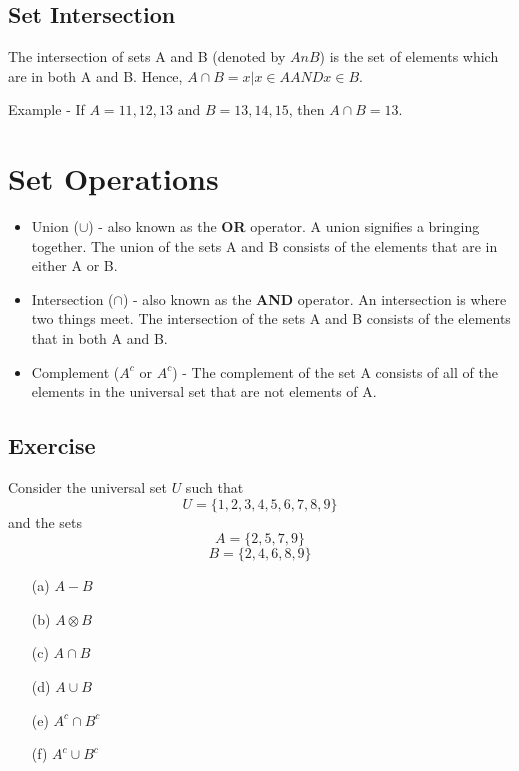 \documentclass[12pt]{article}
\begin{document}
\subsection{Set Intersection}
The intersection of sets A and B (denoted by $AnB$) is the set of elements which are in both A and B. Hence, $A \cap B={x|x \in A AND x \in B}$.

Example - If $A={11,12,13}$ and $B={13,14,15}$, then $A \cap B={13}$.


\newpage
\section*{Set Operations}
\begin{itemize}
	\item Union ($\cup$) - also known as the \textbf{OR} operator. A union signifies a bringing together. The union of the sets A and B consists of the elements that are in either A or B.
	\item Intersection ($\cap$) - also known as the \textbf{AND} operator. An intersection is where two things meet. The intersection of the sets A and B consists of the elements that in both A and B.
	\item Complement ($A^{c}$ or $A^{c}$) - The complement of the set A consists of all of the elements in the universal set that are not elements of A.
\end{itemize}
\subsection*{Exercise}
Consider the universal set $U$ such that
\[U=\{1,2,3,4,5,6,7,8,9\} \]
and the sets
\[A=\{2,5,7,9\} \]
\[B=\{2,4,6,8,9\} \]
\begin{multicols}{2}
\begin{itemize}
	\item[(a)] $A-B$
	\item[(b)] $A \otimes B$
	\item[(c)] $A \cap B$
	\item[(d)] $A \cup B$
	\item[(e)] $A^{c} \cap B^{c}$
	\item[(f)] $A^{c} \cup B^{c}$
\end{itemize}
\end{multicols}
\newpage
\end{document}
